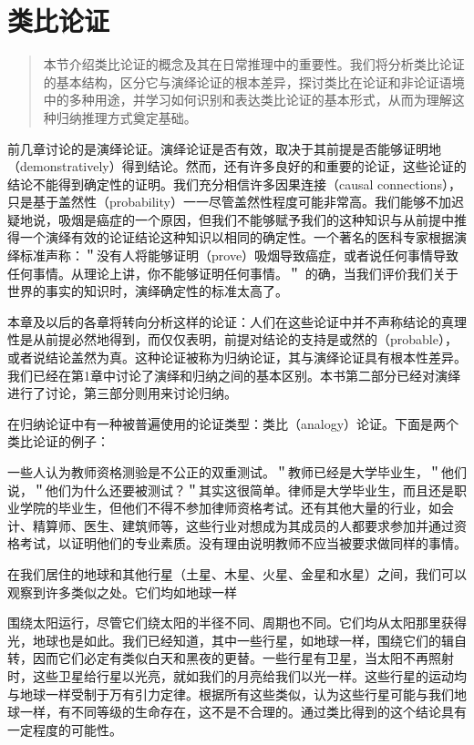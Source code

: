 \section{类比论证}

\begin{quotation}
本节介绍类比论证的概念及其在日常推理中的重要性。我们将分析类比论证的基本结构，区分它与演绎论证的根本差异，探讨类比在论证和非论证语境中的多种用途，并学习如何识别和表达类比论证的基本形式，从而为理解这种归纳推理方式奠定基础。
\end{quotation}

前几章讨论的是演绎论证。演绎论证是否有效，取决于其前提是否能够证明地（demonstratively）得到结论。然而，还有许多良好的和重要的论证，这些论证的结论不能得到确定性的证明。我们充分相信许多因果连接（causal connections），只是基于盖然性（probability）一一尽管盖然性程度可能非常高。我们能够不加迟疑地说，吸烟是癌症的一个原因，但我们不能够赋予我们的这种知识与从前提中推得一个演绎有效的论证结论这种知识以相同的确定性。一个著名的医科专家根据演绎标准声称：＂没有人将能够证明（prove）吸烟导致癌症，或者说任何事情导致任何事情。从理论上讲，你不能够证明任何事情。＂\cite{surgeon1964} 的确，当我们评价我们关于世界的事实的知识时，演绎确定性的标准太高了。

本章及以后的各章将转向分析这样的论证：人们在这些论证中并不声称结论的真理性是从前提必然地得到，而仅仅表明，前提对结论的支持是或然的（probable），或者说结论盖然为真。这种论证被称为归纳论证，其与演绎论证具有根本性差异。我们已经在第1章中讨论了演绎和归纳之间的基本区别。本书第二部分已经对演绎进行了讨论，第三部分则用来讨论归纳。

在归纳论证中有一种被普遍使用的论证类型：类比（analogy）论证。下面是两个类比论证的例子：

一些人认为教师资格测验是不公正的双重测试。＂教师已经是大学毕业生，＂他们说，＂他们为什么还要被测试？＂其实这很简单。律师是大学毕业生，而且还是职业学院的毕业生，但他们不得不参加律师资格考试。还有其他大量的行业，如会计、精算师、医生、建筑师等，这些行业对想成为其成员的人都要求参加并通过资格考试，以证明他们的专业素质。没有理由说明教师不应当被要求做同样的事情。\cite{davis1986}

在我们居住的地球和其他行星（土星、木星、火星、金星和水星）之间，我们可以观察到许多类似之处。它们均如地球一样

围绕太阳运行，尽管它们绕太阳的半径不同、周期也不同。它们均从太阳那里获得光，地球也是如此。我们已经知道，其中一些行星，如地球一样，围绕它们的辑自转，因而它们必定有类似白天和黑夜的更替。一些行星有卫星，当太阳不再照射时，这些卫星给行星以光亮，就如我们的月亮给我们以光一样。这些行星的运动均与地球一样受制于万有引力定律。根据所有这些类似，认为这些行星可能与我们地球一样，有不同等级的生命存在，这不是不合理的。通过类比得到的这个结论具有一定程度的可能性。\cite{reid1785}

